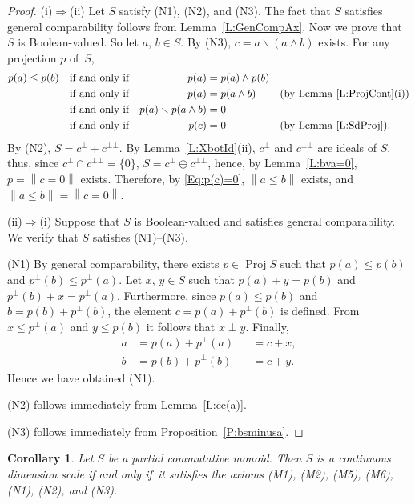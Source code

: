 \documentclass[psamsfonts,reqno]{memo-l}
\theoremstyle{plain}
\newtheorem{corollary}[lemma]{Corollary}
\theoremstyle{definition}
\theoremstyle{remark}
\numberwithin{equation}{section}
\renewcommand{\iff}{if and only if}
\newcommand{\sd}{\smallsetminus}
\newcommand{\bv}[1]{\left\|#1\right\|}
\DeclareMathOperator{\BB}{Proj}
\newcommand{\pcm}{partial commutative mon\-oid}
\newcommand{\set}[1]{\{#1\}}
\begin{document}
\begin{proof}
(i)$\Rightarrow$(ii) Let $S$ satisfy (N1), (N2), and (N3).
The fact that $S$ satisfies general comparability follows from
Lemma~\ref{L:GenCompAx}. Now we prove that $S$ is
Boolean-valued. So let $a$,
$b\in S$. By (N3), $c=a\sd(a\wedge b)$ exists. For any projection $p$
of~$S$,
   \begin{align}
   p(a)\leq p(b)&&\text{\iff}&&p(a)&=p(a)\wedge p(b)&&\notag\\
   &&\text{\iff}&&p(a)&=p(a\wedge b)&&
   \text{(by Lemma~\ref{L:ProjCont}(i))}\notag\\
   &&\text{\iff}&&p(a)\sd p(a\wedge b)&=0&&\notag\\
   &&\text{\iff}&&p(c)&=0&&\text{(by Lemma~\ref{L:SdProj})}.\label{Eq:p(c)=0}
   \end{align}
By (N2), $S=c^\bot+c^{\bot\bot}$. By Lemma~\ref{L:XbotId}(ii), $c^\bot$
and $c^{\bot\bot}$ are ideals of $S$, thus, since
$c^\bot\cap c^{\bot\bot}=\set{0}$, $S=c^\bot\oplus c^{\bot\bot}$, hence, by
Lemma~\ref{L:bva=0}, $p=\bv{c=0}$ exists. Therefore, by \eqref{Eq:p(c)=0},
$\bv{a\leq b}$ exists, and $\bv{a\leq b}=\bv{c=0}$.

(ii)$\Rightarrow$(i) Suppose that $S$ is Boolean-valued
and satisfies general
comparability. We verify that $S$ satisfies (N1)--(N3).

(N1) By general comparability, there exists
$p\in\BB{S}$\index{pzzroj@$\BB{S}$} such that
$p(a)\leq p(b)$ and $p^\bot(b)\leq p^\bot(a)$. Let $x$, $y\in S$ such that
$p(a)+y=p(b)$ and $p^\bot(b)+x=p^\bot(a)$. Furthermore, since $p(a)\leq p(b)$
and $b=p(b)+p^\bot(b)$, the element $c=p(a)+p^\bot(b)$ is defined. {}From
$x\leq p^\bot(a)$ and $y\leq p(b)$ it follows that $x\perp y$. Finally,
   \[
   \begin{aligned}
   a&=p(a)+p^\bot(a)&&=c+x,\\
   b&=p(b)+p^\bot(b)&&=c+y.
   \end{aligned}
   \]
Hence we have obtained (N1).

(N2) follows immediately from Lemma~\ref{L:cc(a)}.

(N3) follows immediately from Proposition~\ref{P:bsminusa}.
\end{proof}

\begin{corollary}\label{C:AltAx}
Let $S$ be a \pcm. Then $S$ is a continuous dimension scale \iff\ it satisfies the axioms
\textup{(M1)}, \textup{(M2)},
\textup{(M5)}, \textup{(M6)}, \textup{(N1)}, \textup{(N2)}, and
\textup{(N3)}.
\end{corollary}
\end{document}
